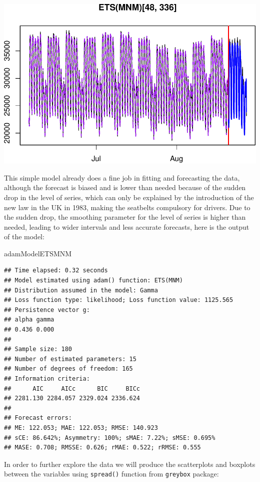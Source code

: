 \documentclass[
]{book}
\newenvironment{Shaded}{\begin{snugshade}}{\end{snugshade}}
\newcommand{\NormalTok}[1]{#1}
\theoremstyle{definition}
\theoremstyle{definition}
\theoremstyle{definition}
\theoremstyle{definition}
\theoremstyle{remark}
\begin{document}
\includegraphics{adam_files/figure-latex/unnamed-chunk-79-1.pdf}

This simple model already does a fine job in fitting and forecasting the data, although the forecast is biased and is lower than needed because of the sudden drop in the level of series, which can only be explained by the introduction of the new law in the UK in 1983, making the seatbelts compulsory for drivers. Due to the sudden drop, the smoothing parameter for the level of series is higher than needed, leading to wider intervals and less accurate forecasts, here is the output of the model:

\begin{Shaded}
\begin{Highlighting}[]
\NormalTok{adamModelETSMNM}
\end{Highlighting}
\end{Shaded}

\begin{verbatim}
## Time elapsed: 0.32 seconds
## Model estimated using adam() function: ETS(MNM)
## Distribution assumed in the model: Gamma
## Loss function type: likelihood; Loss function value: 1125.565
## Persistence vector g:
## alpha gamma 
## 0.436 0.000 
## 
## Sample size: 180
## Number of estimated parameters: 15
## Number of degrees of freedom: 165
## Information criteria:
##      AIC     AICc      BIC     BICc 
## 2281.130 2284.057 2329.024 2336.624 
## 
## Forecast errors:
## ME: 122.053; MAE: 122.053; RMSE: 140.923
## sCE: 86.642%; Asymmetry: 100%; sMAE: 7.22%; sMSE: 0.695%
## MASE: 0.708; RMSSE: 0.626; rMAE: 0.522; rRMSE: 0.555
\end{verbatim}

In order to further explore the data we will produce the scatterplots and boxplots between the variables using \texttt{spread()} function from \texttt{greybox} package:
\end{document}
